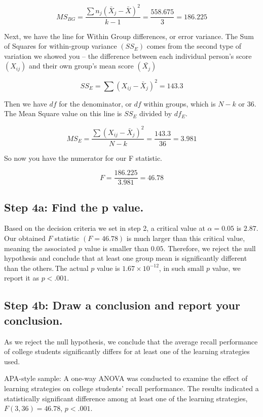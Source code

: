 \documentclass[
  letterpaper,
  DIV=11,
  numbers=noendperiod]{scrreprt}
\begin{document}
\[
MS_{BG} = \frac{\sum n_j \left( \bar{X}_j - \bar{X} \right)^2}{k - 1}
= \frac{558.675}{3}
= 186.225
\]

Next, we have the line for Within Group differences, or error variance.
The Sum of Squares for within-group variance \((SS_E)\) comes from the
second type of variation we showed you -- the difference between each
individual person's score \((X_{ij})\) and their own group's mean score
\((\bar{X_j})\)

\[
SS_E = \sum (X_{ij} - \bar{X}_j)^2 = 143.3
\]

Then we have \(df\) for the denominator, or \(df\) within groups, which
is \(N - k\) or \(36\). The Mean Square value on this line is \(SS_E\)
divided by \(df_E\).

\[
MS_E = \frac{\sum (X_{ij} - \bar{X}_j)^2}{N - k}
= \frac{143.3}{36}
= 3.981
\]

So now you have the numerator for our F statistic.

\[
F = \frac{186.225}{3.981} = 46.78
\]

\subsection*{Step 4a: Find the p
value.}\label{step-4a-find-the-p-value.-2}

Based on the decision criteria we set in step 2, a critical value at
\(\alpha = 0.05\) is \(2.87\). Our obtained \(F\) statistic
\((F = 46.78)\) is much larger than this critical value, meaning the
associated \(p\) value is smaller than \(0.05\). Therefore, we reject
the null hypothesis and conclude that at least one group mean is
significantly different than the others.\,The actual \(p\) value is
\(1.67×10^{−12}\), in such small \(p\) value, we report it as
\(p < .001\).

\subsection*{Step 4b: Draw a conclusion and report your
conclusion.\,\,\,\,}\label{step-4b-draw-a-conclusion-and-report-your-conclusion.-2}

As we reject the null hypothesis, we conclude that the average recall
performance of college students significantly differs for at least one
of the learning strategies used.

APA-style sample: A one-way ANOVA was conducted to examine the effect of
learning strategies on college students' recall performance. The results
indicated a statistically significant difference among at least one of
the learning strategies, \(F(3,36) = 46.78\), \(p < .001\).
\end{document}

